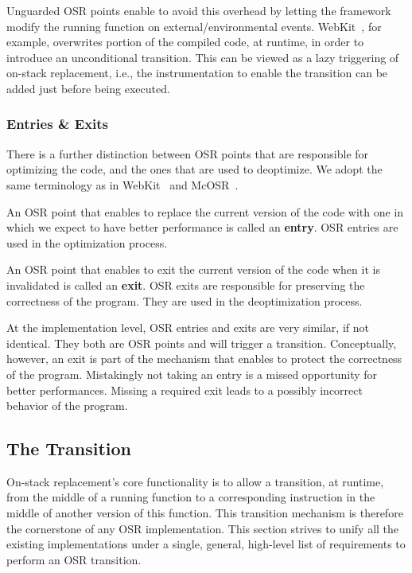 Unguarded OSR points enable to avoid this overhead by letting the framework modify the running function on external/environmental events.
WebKit~\cite{WebKitURL}, for example, overwrites portion of the compiled code, at runtime, in order to introduce an unconditional transition.
This can be viewed as a lazy triggering of on-stack replacement, i.e., the instrumentation to enable the transition can be added just before being executed.\\

\subsubsection{Entries \& Exits}

There is a further distinction between OSR points that are responsible for optimizing the code, and the ones that are used to deoptimize.
We adopt the same terminology as in WebKit~\cite{WebKitURL} and McOSR~\cite{lameed2013modular}.

\begin{definition}\label{OSREntryDefinition}
An OSR point that enables to replace the current version of the code with one in which we expect to have better performance is called an \textbf{entry}.
OSR entries are used in the optimization process.
\end{definition}

\begin{definition}
An OSR point that enables to exit the current version of the code when it is invalidated is called an \textbf{exit}.
OSR exits are responsible for preserving the correctness of the program.
They are used in the deoptimization process.
\end{definition}

At the implementation level, OSR entries and exits are very similar, if not identical. 
They both are OSR points and will trigger a transition.
Conceptually, however, an exit is part of the mechanism that enables to protect the correctness of the program.
Mistakingly not taking an entry is a missed opportunity for better performances.
Missing a required exit leads to a possibly incorrect behavior of the program.\\

\subsection{The Transition}
On-stack replacement's core functionality is to allow a transition, at runtime, from the middle of a running function to a corresponding instruction in the middle of another version of this function.
This transition mechanism is therefore the cornerstone of any OSR implementation.
This section strives to unify all the existing implementations under a single, general, high-level list of requirements to perform an OSR transition.\\

